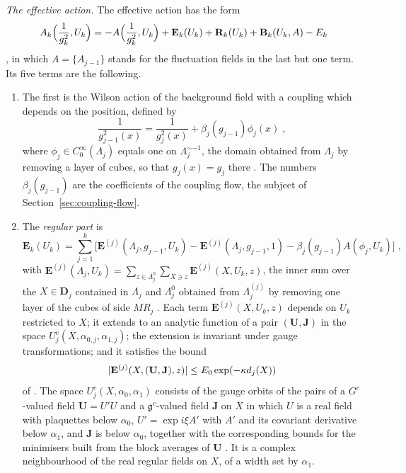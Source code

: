 \documentclass[11pt]{preprint}
\DeclarePairedDelimiter{\abs}{\lvert}{\rvert}
\numberwithin{equation}{section}
\theoremstyle{definition}
\theoremstyle{remark}
\theoremstyle{plain}
\begin{document}
\emph{The effective action.} The effective action has the form
\begin{equation}\label{eq:effective-action}
    A_k\Bigl(\frac{1}{g_k^2}, U_k\Bigr) = -A\Bigl(\frac{1}{g_k^2}, U_k\Bigr) + \mathbf E_k(U_k) + \mathbf R_k(U_k) + \mathbf B_k(U_k, A) - E_k
\end{equation}
\cite[(2.23), p.~258]{BalabanCRE}, in which $A = \{ A_{j-1} \}$ stands for the fluctuation fields in the last but one term. Its five terms are the following.
\begin{enumerate}[label=(\alph*)]
\item The first is the Wilson action of the background field with a coupling which depends on the position, defined by
\begin{equation}\label{eq:position-coupling}
    \frac{1}{g_{j-1}^2(x)} = \frac{1}{g_j^2(x)} + \beta_j(g_{j-1})\phi_j(x)\;,
\end{equation}
where $\phi_j \in C_0^\infty(\Lambda_j)$ equals one on $\Lambda_j^{\sim-1}$, the domain obtained from $\Lambda_j$ by removing a layer of cubes, so that $g_j(x) = g_j$ there \cite[(2.24), p.~259]{BalabanCRE}. The numbers $\beta_j(g_{j-1})$ are the coefficients of the coupling flow, the subject of Section~\ref{sec:coupling-flow}.
\item The \emph{regular part} is
\begin{equation}\label{eq:regular-part}
    \mathbf E_k(U_k) = \sum_{j=1}^{k}\bigl[\mathbf E^{(j)}(\Lambda_j, g_{j-1}, U_k) - \mathbf E^{(j)}(\Lambda_j, g_{j-1}, 1) - \beta_j(g_{j-1})A(\phi_j, U_k)\bigr]\;,
\end{equation}
with $\mathbf E^{(j)}(\Lambda_j, U_k) = \sum_{z \in \Lambda_j^0}\sum_{X \ni z}\mathbf E^{(j)}(X, U_k, z)$, the inner sum over the $X \in \mathbf D_j$ contained in $\Lambda_j$ and $\Lambda_j^0$ obtained from $\Lambda_j^{(j)}$ by removing one layer of the cubes of side $MR_j$ \cite[(2.25)--(2.27), p.~259]{BalabanCRE}. Each term $\mathbf E^{(j)}(X, U_k, z)$ depends on $U_k$ restricted to $X$; it extends to an analytic function of a pair $(\mathbf U, \mathbf J)$ in the space $U_j^c(X, \alpha_{0,j}, \alpha_{1,j})$; the extension is invariant under gauge transformations; and it satisfies the bound
\begin{equation}\label{eq:regular-bound}
    \abs{\mathbf E^{(j)}(X, (\mathbf U, \mathbf J), z)} \leq E_0\exp(-\kappa d_j(X))
\end{equation}
of \cite[(1.18), p.~263]{BalabanRG1}. The space $U_j^c(X, \alpha_0, \alpha_1)$ consists of the gauge orbits of the pairs of a $G^c$-valued field $\mathbf U = U'U$ and a $\mathfrak g^c$-valued field $\mathbf J$ on $X$ in which $U$ is a real field with plaquettes below $\alpha_0$, $U' = \exp i\xi A'$ with $A'$ and its covariant derivative below $\alpha_1$, and $\mathbf J$ is below $\alpha_0$, together with the corresponding bounds for the minimisers built from the block averages of $\mathbf U$ \cite[Definition, (1.10)--(1.16), p.~262]{BalabanRG1}. It is a complex neighbourhood of the real regular fields on $X$, of a width set by $\alpha_1$.

\end{enumerate}
\end{document}
